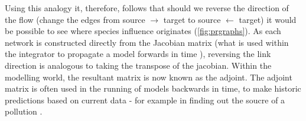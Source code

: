 Using this analogy it, therefore, follows that should we reverse the direction of the flow (change the edges from source $\rightarrow$ target to source $\leftarrow$ target) it would be possible to see where species influence originates (\autoref{fig:prgraphs}). As each network is constructed directly from the Jacobian matrix (what is used within the integrator to propagate a model forwards in time ), reversing the link direction is analogous to taking the transpose of the jacobian. Within the modelling world, the resultant matrix is now known as the adjoint. The adjoint matrix is often used in the running of models backwards in time, to make historic predictions based on current data - for example in finding out the soucre of a pollution \citep{adjgeos}.




